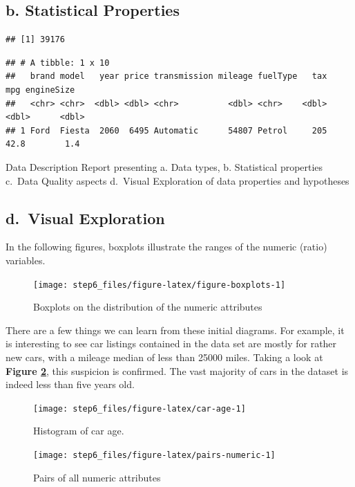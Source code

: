 \documentclass[sigchi]{acmart}
\begin{document}
\hypertarget{b.-statistical-properties}{%
\subsection{b. Statistical Properties}\label{b.-statistical-properties}}

\begin{verbatim}
## [1] 39176
\end{verbatim}

\begin{verbatim}
## # A tibble: 1 x 10
##   brand model   year price transmission mileage fuelType   tax   mpg engineSize
##   <chr> <chr>  <dbl> <dbl> <chr>          <dbl> <chr>    <dbl> <dbl>      <dbl>
## 1 Ford  Fiesta  2060  6495 Automatic      54807 Petrol     205  42.8        1.4
\end{verbatim}

Data Description Report presenting
a. Data types,
b. Statistical properties
c.~Data Quality aspects
d.~Visual Exploration of data properties and hypotheses

\hypertarget{d.-visual-exploration}{%
\subsection{d.~Visual Exploration}\label{d.-visual-exploration}}

In the following figures, boxplots illustrate the ranges of the numeric (ratio) variables.

\begin{figure}
\texttt{[image: step6\_files/figure-latex/figure-boxplots-1]} \caption{Boxplots on the distribution of the numeric attributes}\label{fig:figure-boxplots}
\end{figure}

There are a few things we can learn from these initial diagrams. For example, it is interesting to see car listings contained in the data set are mostly for rather new cars, with a mileage median of less than 25000 miles. Taking a look at \textbf{Figure \ref{fig:car-age}}, this suspicion is confirmed. The vast majority of cars in the dataset is indeed less than five years old.

\begin{figure}
\texttt{[image: step6\_files/figure-latex/car-age-1]} \caption{Histogram of car age.}\label{fig:car-age}
\end{figure}
\begin{figure}
\texttt{[image: step6\_files/figure-latex/pairs-numeric-1]} \caption{Pairs of all numeric attributes}\label{fig:pairs-numeric}
\end{figure}
\end{document}
